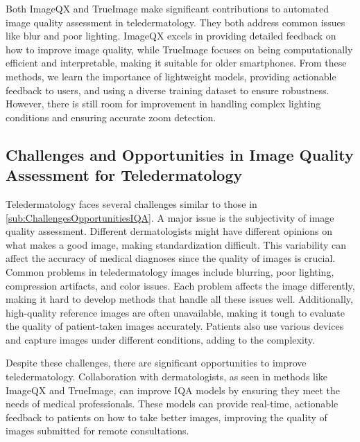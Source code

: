 \par
\vspace{\baselineskip}
\noindent
Both ImageQX and TrueImage make significant contributions to automated image quality assessment in teledermatology. They both address common issues like blur and poor lighting. ImageQX excels in providing detailed feedback on how to improve image quality, while TrueImage focuses on being computationally efficient and interpretable, making it suitable for older smartphones. From these methods, we learn the importance of lightweight models, providing actionable feedback to users, and using a diverse training dataset to ensure robustness. However, there is still room for improvement in handling complex lighting conditions and ensuring accurate zoom detection. \par

\subsection{Challenges and Opportunities in Image Quality Assessment for Teledermatology}
\label{sub:ChallengesOpportunitiesTeledermatology}
Teledermatology faces several challenges similar to those in \autoref{sub:ChallengesOpportunitiesIQA}. A major issue is the subjectivity of image quality assessment. Different dermatologists might have different opinions on what makes a good image, making standardization difficult. This variability can affect the accuracy of medical diagnoses since the quality of images is crucial. Common problems in teledermatology images include blurring, poor lighting, compression artifacts, and color issues. Each problem affects the image differently, making it hard to develop methods that handle all these issues well. Additionally, high-quality reference images are often unavailable, making it tough to evaluate the quality of patient-taken images accurately. Patients also use various devices and capture images under different conditions, adding to the complexity. \par
\vspace{\baselineskip}
\noindent
Despite these challenges, there are significant opportunities to improve teledermatology. Collaboration with dermatologists, as seen in methods like ImageQX and TrueImage, can improve IQA models by ensuring they meet the needs of medical professionals. These models can provide real-time, actionable feedback to patients on how to take better images, improving the quality of images submitted for remote consultations.